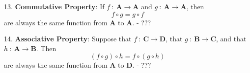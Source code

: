 \documentclass{article}
\newcommand\A{\mathbf A}
\newcommand\B{\mathbf B}
\newcommand\C{\mathbf C}
\newcommand\D{\mathbf D}
\newcommand{\0}{\mathbf 0}
\newcommand{\1}{\mathbf 1}
\begin{document}
\begin{description}
  \item{13.} \textbf{Commutative Property}: If $f\ :\ \A \to \A$ and $g\ :\ \A \to \A$, then
    \begin{equation*}
    f \circ g = g \circ f
    \end{equation*}
    are always the same function from $\A$ to $\A$. - ???

  \item{14.} \textbf{Associative Property}: Suppose that $f\ :\ \C \to \D$, that $g\ :\ \B \to \C$, and that $h\ :\ \A \to \B$. Then
    \begin{equation*}
    (f \circ g) \circ h = f \circ (g \circ h)
    \end{equation*}
    are always the same function from $\A$ to $\D$. - ???
\end{description}

$\ $
\end{document}
